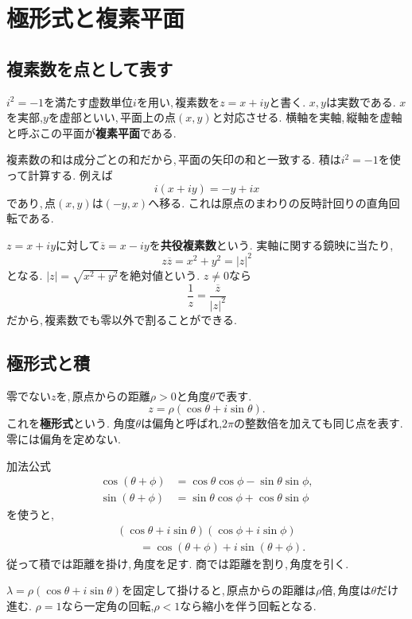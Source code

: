 \section{極形式と複素平面}\label{節：極形式と複素平面}
\subsection{複素数を点として表す}

$i^2=-1$を満たす虚数単位$i$を用い,\,複素数を$z=x+iy$と書く.
$x,y$は実数である.
$x$を実部,$y$を虚部といい,\,平面上の点$(x,y)$と対応させる.
横軸を実軸,\,縦軸を虚軸と呼ぶこの平面が\textbf{複素平面}である.

複素数の和は成分ごとの和だから,\,平面の矢印の和と一致する.
積は$i^2=-1$を使って計算する.
例えば
\[
 i(x+iy)=-y+ix
\]
であり,\,点$(x,y)$は$(-y,x)$へ移る.
これは原点のまわりの反時計回りの直角回転である.

$z=x+iy$に対して$\overline z=x-iy$を\textbf{共役複素数}という.
実軸に関する鏡映に当たり,
\[
 z\overline z=x^2+y^2=|z|^2
\]
となる. $|z|=\sqrt{x^2+y^2}$を絶対値という.
$z\ne0$なら
\[
 \frac1z=\frac{\overline z}{|z|^2}
\]
だから,\,複素数でも零以外で割ることができる.

\subsection{極形式と積}

零でない$z$を,\,原点からの距離$\rho>0$と角度$\theta$で表す.
\[
 z=\rho(\cos\theta+i\sin\theta).
\]
これを\textbf{極形式}という.
角度$\theta$は偏角と呼ばれ,$2\pi$の整数倍を加えても同じ点を表す.
零には偏角を定めない.

加法公式
\[
 \begin{aligned}
 \cos(\theta+\phi)&=\cos\theta\cos\phi-\sin\theta\sin\phi,\\
 \sin(\theta+\phi)&=\sin\theta\cos\phi+\cos\theta\sin\phi
 \end{aligned}
\]
を使うと,
\[
 \begin{aligned}
 &(\cos\theta+i\sin\theta)(\cos\phi+i\sin\phi)\\
 &\qquad=\cos(\theta+\phi)+i\sin(\theta+\phi).
 \end{aligned}
\]
従って積では距離を掛け,\,角度を足す.
商では距離を割り,\,角度を引く.

$\lambda=\rho(\cos\theta+i\sin\theta)$を固定して掛けると,\,原点からの距離は$\rho$倍,\,角度は$\theta$だけ進む.
$\rho=1$なら一定角の回転,$\rho<1$なら縮小を伴う回転となる.
\NewFigRotation

